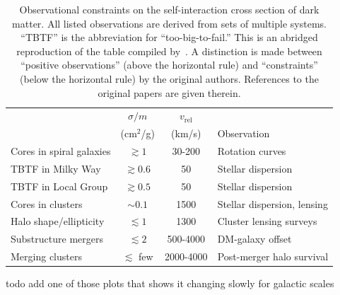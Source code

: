 \begin{table}
    \centering
    \begin{tabular}{lccl}\toprule
        & $\sigma / m$ & $v_{\text{rel}}$ &
        \\
        & (cm$^2$/g) & (km/s) & Observation
        \\ \midrule
        Cores in spiral galaxies
        & $\gtrsim 1$ & 30-200 & Rotation curves
        \\
        TBTF in Milky Way
        & $\gtrsim 0.6$ & 50 & Stellar dispersion
        \\
        TBTF in Local Group 
        & $\gtrsim 0.5$ & 50 & Stellar dispersion
        \\
        Cores in clusters 
        & $\sim 0.1$ & 1500 & Stellar dispersion, lensing
        \\ \midrule
        Halo shape/ellipticity
        & $\lesssim 1$ & 1300 & Cluster lensing surveys
        \\
        Substructure mergers
        & $\lesssim 2$ & 500-4000 & DM-galaxy offset
        \\
        Merging clusters
        & $\lesssim$ few & 2000-4000 & Post-merger halo survival
        \\ \bottomrule
    \end{tabular}
    \caption{%
        Observational constraints on the self-interaction cross section of
        dark matter. All listed observations are derived from sets of multiple
        systems. ``TBTF'' is the abbreviation for ``too-big-to-fail.'' This is
        an abridged reproduction of the table compiled
        by~\cite{tulin_dark_2018}. A distinction is made between ``positive
        observations'' (above the horizontal rule) and ``constraints'' (below
        the horizontal rule) by the original authors. References to the
        original papers are given therein.
    }
    \label{tab:constraints}
\end{table}

todo add one of those plots that shows it changing slowly for galactic scales

